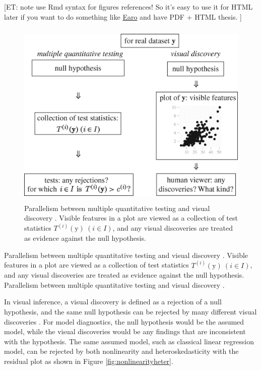 \documentclass{monashthesis}
\begin{document}
{[}ET: note use Rmd syntax for figures references! So it's easy to use it for HTML later if you want to do something like \href{https://github.com/earowang/thesis}{Earo} and have PDF + HTML thesis. {]}

\begin{figure}
\centering
\includegraphics[width=4.6875in,height=3.55208in]{figures/rsta2009012001.jpg}
\caption{Parallelism between multiple quantitative testing and visual discovery \autocite{buja_statistical_2009}. Visible features in a plot are viewed as a collection of test statistics \(T^{(i)}(\boldsymbol{\mathrm{y}})~(i \in I)\), and any visual discoveries are treated as evidence against the null hypothesis. \label{fig:parallelism}}
\end{figure}

Parallelism between multiple quantitative testing and visual discovery \autocite{buja_statistical_2009}. Visible features in a plot are viewed as a collection of test statistics \(T^{(i)}(\boldsymbol{\mathrm{y}})~(i \in I)\), and any visual discoveries are treated as evidence against the null hypothesis. Parallelism between multiple quantitative testing and visual discovery \autocite{buja_statistical_2009}.

In visual inference, a visual discovery is defined as a rejection of a null hypothesis, and the same null hypothesis can be rejected by many different visual discoveries \autocite{buja_statistical_2009}. For model diagnostics, the null hypothesis would be the assumed model, while the visual discoveries would be any findings that are inconsistent with the hypothesis. The same assumed model, such as classical linear regression model, can be rejected by both nonlinearity and heteroskedasticity with the residual plot as shown in Figure \ref{fig:nonlinearityheter}.
\end{document}
